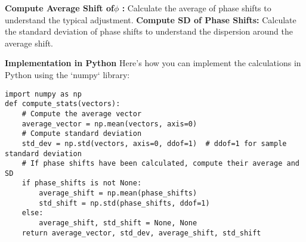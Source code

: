 \documentclass[twocolumn]{article}
\begin{document}
\noindent \textbf{Compute Average Shift of$\phi$ :} Calculate the average of phase shifts to understand the typical adjustment.
\noindent \textbf{Compute SD of Phase Shifts:} Calculate the standard deviation of phase shifts to understand the dispersion around the average shift.

\noindent \textbf{Implementation in Python}
Here's how you can implement the calculations in Python using the `numpy` library:

\begin{lstlisting}[style=Python]
import numpy as np
def compute_stats(vectors):
    # Compute the average vector
    average_vector = np.mean(vectors, axis=0)
    # Compute standard deviation
    std_dev = np.std(vectors, axis=0, ddof=1)  # ddof=1 for sample standard deviation
    # If phase shifts have been calculated, compute their average and SD
    if phase_shifts is not None:
        average_shift = np.mean(phase_shifts)
        std_shift = np.std(phase_shifts, ddof=1)
    else:
        average_shift, std_shift = None, None
    return average_vector, std_dev, average_shift, std_shift
\end{lstlisting}
\end{document}
